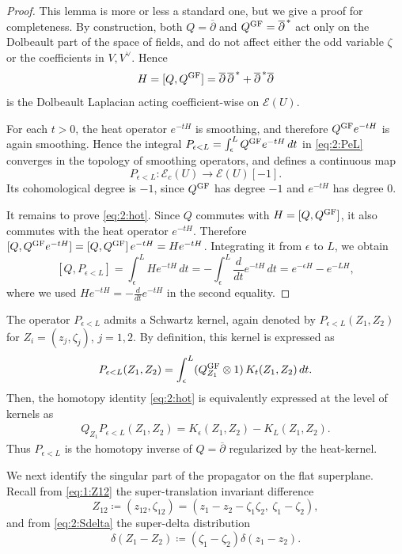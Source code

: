 \documentclass[final,reqno]{amsart}
\numberwithin{equation}{section}
\theoremstyle{definition}
\newcommand{\ep}{\epsilon}
\newcommand{\ceq}{\coloneqq} %
\newcommand{\lto}{\longrightarrow}
\newcommand{\GF}{\textup{GF}}
\newcommand{\clE}{\mathcal{E}}
\newcommand{\bpd}{\overline{\partial}}
\begin{document}
\begin{proof}
This lemma is more or less a standard one, 
but we give a proof for completeness.
By construction, both $Q=\bpd$ and $Q^{\GF}=\bpd^{\,*}$ 
act only on the Dolbeault part of the space of fields, and do not affect
either the odd variable $\zeta$ or the coefficients in $V,V^\vee$. 
Hence
\[
 H = [Q,Q^{\GF}] = \bpd\,\bpd^{\,*} + \bpd^{\,*}\bpd
\]
is the Dolbeault Laplacian acting coefficient-wise on $\clE(U)$.

For each $t>0$, the heat operator $e^{-tH}$ is smoothing, 
and therefore $Q^{\GF}e^{-tH}$ is again smoothing. 
Hence the integral
$P_{\ep<L} = \int_\ep^L Q^{\GF}e^{-tH}\,dt$ in \eqref{eq:2:PeL} 
converges in the topology of smoothing operators, and defines a continuous map
\[
 P_{\ep<L}\colon \clE_c(U) \lto \clE(U)[-1].
\]
Its cohomological degree is $-1$, 
since $Q^{\GF}$ has degree $-1$ and $e^{-tH}$ has degree $0$.

It remains to prove \eqref{eq:2:hot}. 
Since $Q$ commutes with $H=[Q,Q^{\GF}]$, 
it also commutes with the heat operator $e^{-tH}$. 
Therefore
$[Q,Q^{\GF}e^{-tH}] = [Q,Q^{\GF}]\,e^{-tH} = He^{-tH}$.
Integrating it from $\ep$ to $L$, we obtain
\[
 [Q,P_{\ep<L}] = \int_\ep^L He^{-tH}\,dt =
 -\int_\ep^L \frac{d}{dt}e^{-tH}\,dt =
 e^{-\ep H}-e^{-LH},
\]
where we used $He^{-tH}=-\frac{d}{dt}e^{-tH}$ in the second equality.
\end{proof}

The operator $P_{\ep<L}$ admits a Schwartz kernel, again denoted by
$P_{\ep<L}(Z_1,Z_2)$ for $Z_i=(z_j,\zeta_j)$, $j=1,2$.
By definition, this kernel is expressed as 
\begin{align*}
 P_{\ep<L}(Z_1,Z_2) = \int_\ep^L (Q^{\GF}_{Z_1}\otimes 1)\,K_t(Z_1,Z_2)\,dt.
\end{align*}
Then, the homotopy identity \eqref{eq:2:hot} is equivalently expressed 
at the level of kernels as
\begin{align}\label{eq:2:ker-hot}
 Q_{Z_1}P_{\ep<L}(Z_1,Z_2) = K_\ep(Z_1,Z_2)-K_L(Z_1,Z_2).
\end{align}
Thus $P_{\ep<L}$ is the homotopy inverse of $Q=\bpd$ regularized by the heat-kernel.

We next identify the singular part of the propagator on the flat superplane. 
Recall from \eqref{eq:1:Z12} the super-translation invariant difference
\[
 Z_{12} \ceq (z_{12},\zeta_{12})=(z_1-z_2-\zeta_1\zeta_2,\ \zeta_1-\zeta_2),
\]
and from \eqref{eq:2:Sdelta} the super-delta distribution
\[
 \delta(Z_1-Z_2) \ceq (\zeta_1-\zeta_2)\delta(z_1-z_2).
\]
\end{document}
